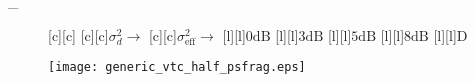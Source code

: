 _\documentclass{article}
\begin{document}
\begin{figure}[htb]
  \begin{center}

        [c][c]{}
        [c][c]{$\sigma_d^2 \rightarrow$}
        [c][c]{$\sigma_{\mathrm{eff}}^2 \rightarrow$}
        [l][l]{$\mathrm{0dB}$}
        [l][l]{$\mathrm{3dB}$}
	[l]{$\mathrm{5dB}$}
	[l]{$\mathrm{8dB}$}
        [l][l]{$\mathrm{D}$}       

    \texttt{[image: generic\_vtc\_half\_psfrag.eps]}
    \end{center}
\end{figure}
\end{document}
